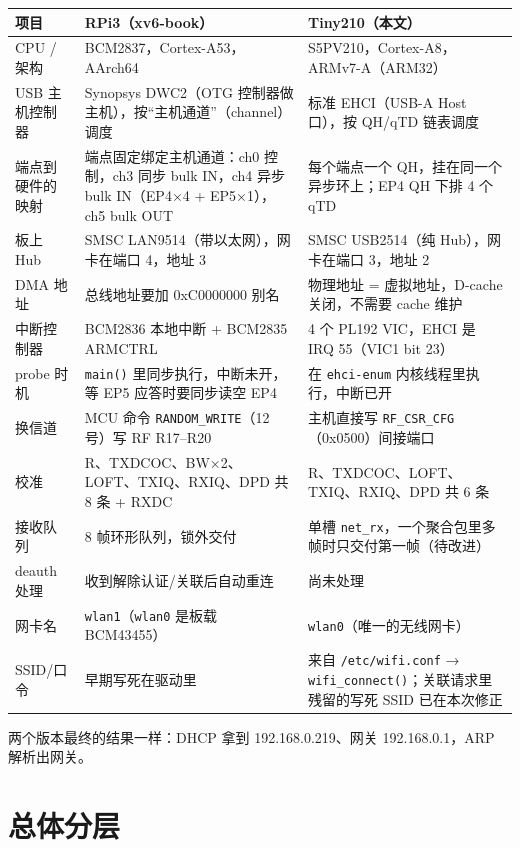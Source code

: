 \documentclass[UTF8,zihao=-4,fontset=none]{ctexart}
\newcommand{\fn}[1]{\texttt{#1}}
\begin{document}
\begin{longtable}{p{26mm}p{60mm}p{62mm}}
\toprule
项目 & RPi3（xv6-book） & Tiny210（本文） \\ \midrule \endhead
CPU / 架构 & BCM2837，Cortex-A53，AArch64 & S5PV210，Cortex-A8，ARMv7-A（ARM32） \\
USB 主机控制器 & Synopsys DWC2（OTG 控制器做主机），按“主机通道”（channel）调度 & 标准 EHCI（USB-A Host 口），按 QH/qTD 链表调度 \\
端点到硬件的映射 & 端点固定绑定主机通道：ch0 控制，ch3 同步 bulk IN，ch4 异步 bulk IN（EP4×4 + EP5×1），ch5 bulk OUT & 每个端点一个 QH，挂在同一个异步环上；EP4 QH 下排 4 个 qTD \\
板上 Hub & SMSC LAN9514（带以太网），网卡在端口 4，地址 3 & SMSC USB2514（纯 Hub），网卡在端口 3，地址 2 \\
DMA 地址 & 总线地址要加 0xC0000000 别名 & 物理地址 = 虚拟地址，D-cache 关闭，不需要 cache 维护 \\
中断控制器 & BCM2836 本地中断 + BCM2835 ARMCTRL & 4 个 PL192 VIC，EHCI 是 IRQ 55（VIC1 bit 23） \\
probe 时机 & \fn{main()} 里同步执行，中断未开，等 EP5 应答时要同步读空 EP4 & 在 \fn{ehci-enum} 内核线程里执行，中断已开 \\
换信道 & MCU 命令 \fn{RANDOM\_WRITE}（12 号）写 RF R17--R20 & 主机直接写 \fn{RF\_CSR\_CFG}（0x0500）间接端口 \\
校准 & R、TXDCOC、BW×2、LOFT、TXIQ、RXIQ、DPD 共 8 条 + RXDC & R、TXDCOC、LOFT、TXIQ、RXIQ、DPD 共 6 条 \\
接收队列 & 8 帧环形队列，锁外交付 & 单槽 \fn{net\_rx}，一个聚合包里多帧时只交付第一帧（待改进） \\
deauth 处理 & 收到解除认证/关联后自动重连 & 尚未处理 \\
网卡名 & \fn{wlan1}（\fn{wlan0} 是板载 BCM43455） & \fn{wlan0}（唯一的无线网卡） \\
SSID/口令 & 早期写死在驱动里 & 来自 \fn{/etc/wifi.conf} → \fn{wifi\_connect()}；关联请求里残留的写死 SSID 已在本次修正 \\
\bottomrule
\end{longtable}

两个版本最终的结果一样：DHCP 拿到 192.168.0.219、网关 192.168.0.1，ARP 解析出网关。

\section{总体分层}
\end{document}
